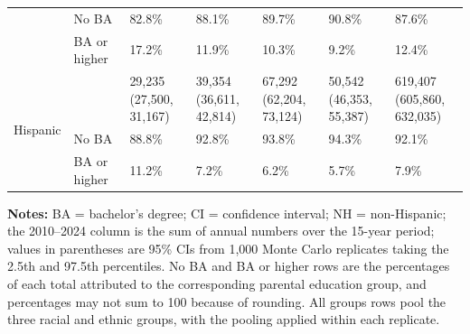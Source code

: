 \begin{threeparttable}
\begin{tabular}{lllllll}
\cmidrule(lr){2-7}
 & No BA & 82.8\% & 88.1\% & 89.7\% & 90.8\% & 87.6\% \\
 & BA or higher & 17.2\% & 11.9\% & 10.3\% & 9.2\% & 12.4\% \\
\cmidrule(lr){1-7}
\multirow{3}{*}{Hispanic} & \raisebox{0.5\height}{\textbf{Total}} & \shortstack[l]{29,235 \\ (27,500, 31,167)} & \shortstack[l]{39,354 \\ (36,611, 42,814)} & \shortstack[l]{67,292 \\ (62,204, 73,124)} & \shortstack[l]{50,542 \\ (46,353, 55,387)} & \shortstack[l]{619,407 \\ (605,860, 632,035)} \\
\cmidrule(lr){2-7}
 & No BA & 88.8\% & 92.8\% & 93.8\% & 94.3\% & 92.1\% \\
 & BA or higher & 11.2\% & 7.2\% & 6.2\% & 5.7\% & 7.9\% \\
\bottomrule
\end{tabular}
\begin{tablenotes}[flushleft]
\small
\item \textbf{Notes:} BA = bachelor's degree; CI = confidence interval; NH = non-Hispanic; the 2010--2024 column is the sum of annual numbers over the 15-year period; values in parentheses are 95\% CIs from 1,000 Monte Carlo replicates taking the 2.5th and 97.5th percentiles. No BA and BA or higher rows are the percentages of each total attributed to the corresponding parental education group, and percentages may not sum to 100 because of rounding. All groups rows pool the three racial and ethnic groups, with the pooling applied within each replicate.
\end{tablenotes}
\end{threeparttable}

